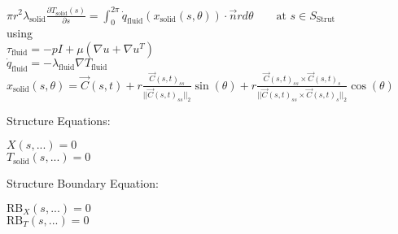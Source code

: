 \documentclass[10pt]{article} %
\begin{document}
\begin{center}
	$ \pi r^2 \lambda_{\text{solid}} \frac{\partial T_{\text{solid}}(s)}{\partial s} = \int_0^{2\pi} \dot q_{\text{fluid}}(x_{\text{solid}}(s,\theta)) \cdot \vec{n} r d\theta \quad  \quad \text{at } s \in S_{\text{Strut}}$\\
	using\\
	$\tau_{\text{fluid}} = - p I + \mu \left(\nabla u + \nabla u ^T\right)$\\
	$\dot q_{\text{fluid}} = - \lambda_{\text{fluid}} \nabla T_{\text{fluid}}$\\
	$x_{\text{solid}}\left(s,\theta\right) = \vec{C}(s,t) + r\frac{\vec{C}(s,t)_{ss}}{\lvert \lvert \vec{C}(s,t)_{ss} \lvert \lvert_2}\sin(\theta) + r\frac{\vec{C}(s,t)_{ss} \times \vec{C}(s,t)_{s}}{\lvert \lvert \vec{C}(s,t)_{ss} \times \vec{C}(s,t)_{s} \lvert \lvert_2}\cos(\theta) $\\
\begin{flushleft}
	Structure Equations:
\end{flushleft}
	$X(s,...) = 0$\\
	$T_{\text{solid}}(s,...) =0$\\
\begin{flushleft}
	Structure Boundary Equation:
\end{flushleft}
	$\text{RB}_X(s,...) = 0$\\
	$\text{RB}_T(s,...) =0$\\
\end{center}
\newpage
\end{document}
